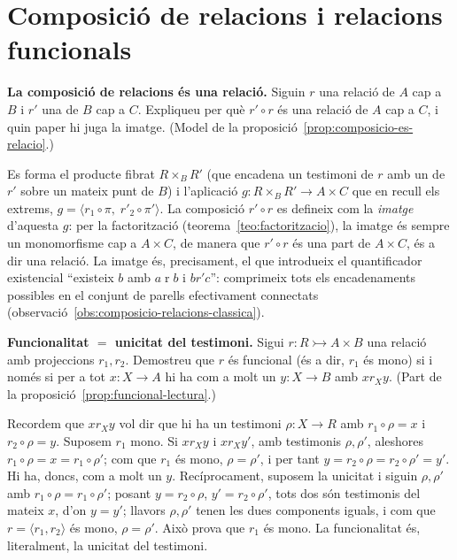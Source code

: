 \section{Composició de relacions i relacions funcionals}\label{prac:relacions-funcionals}

\begin{exercici}
\textbf{La composició de relacions és una relació.} Siguin \(r\) una relació de \(A\) cap a \(B\) i \(r'\) una de \(B\) cap a \(C\). Expliqueu per què \(r'\circ r\) és una relació de \(A\) cap a \(C\), i quin paper hi juga la imatge. (Model de la proposició~\ref{prop:composicio-es-relacio}.)
\end{exercici}
\begin{solucio}
Es forma el producte fibrat \(R\times_B R'\) (que encadena un testimoni de \(r\) amb un de \(r'\) sobre un mateix punt de \(B\)) i l'aplicació \(g\colon R\times_B R'\to A\times C\) que en recull els extrems, \(g=\langle r_1\circ\pi,\;r'_2\circ\pi'\rangle\). La composició \(r'\circ r\) es defineix com la \emph{imatge} d'aquesta \(g\): per la factorització (teorema~\ref{teo:factoritzacio}), la imatge és sempre un monomorfisme cap a \(A\times C\), de manera que \(r'\circ r\) és una part de \(A\times C\), és a dir una relació. La imatge és, precisament, el que introdueix el quantificador existencial \enquote{existeix \(b\) amb \(a\mathrel{r}b\) i \(b\mathrel{r'}c\)}: comprimeix tots els encadenaments possibles en el conjunt de parells efectivament connectats (observació~\ref{obs:composicio-relacions-classica}).
\end{solucio}

\begin{exercici}
\textbf{Funcionalitat \(=\) unicitat del testimoni.} Sigui \(r\colon R\rightarrowtail A\times B\) una relació amb projeccions \(r_1,r_2\). Demostreu que \(r\) és funcional (és a dir, \(r_1\) és mono) si i només si per a tot \(x\colon X\to A\) hi ha com a molt un \(y\colon X\to B\) amb \(x\mathrel{r_X}y\). (Part de la proposició~\ref{prop:funcional-lectura}.)
\end{exercici}
\begin{solucio}
Recordem que \(x\mathrel{r_X}y\) vol dir que hi ha un testimoni \(\rho\colon X\to R\) amb \(r_1\circ\rho=x\) i \(r_2\circ\rho=y\). Suposem \(r_1\) mono. Si \(x\mathrel{r_X}y\) i \(x\mathrel{r_X}y'\), amb testimonis \(\rho,\rho'\), aleshores \(r_1\circ\rho=x=r_1\circ\rho'\); com que \(r_1\) és mono, \(\rho=\rho'\), i per tant \(y=r_2\circ\rho=r_2\circ\rho'=y'\). Hi ha, doncs, com a molt un \(y\). Recíprocament, suposem la unicitat i siguin \(\rho,\rho'\) amb \(r_1\circ\rho=r_1\circ\rho'\); posant \(y=r_2\circ\rho\), \(y'=r_2\circ\rho'\), tots dos són testimonis del mateix \(x\), d'on \(y=y'\); llavors \(\rho,\rho'\) tenen les dues components iguals, i com que \(r=\langle r_1,r_2\rangle\) és mono, \(\rho=\rho'\). Això prova que \(r_1\) és mono. La funcionalitat és, literalment, la unicitat del testimoni.
\end{solucio}

